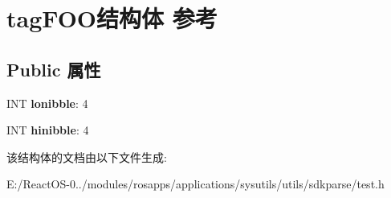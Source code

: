 \hypertarget{structtag_f_o_o}{}\section{tag\+F\+O\+O结构体 参考}
\label{structtag_f_o_o}
\subsection*{Public 属性}
\begin{DoxyCompactItemize}
\item 
\mbox{\label{structtag_f_o_o_ab6ff05a854f1048ebb98945947410295}} 
I\+NT {\bfseries lonibble}\+: 4
\item 
\mbox{\label{structtag_f_o_o_a20c482478d98933ea290a9342397bd1e}} 
I\+NT {\bfseries hinibble}\+: 4
\end{DoxyCompactItemize}


该结构体的文档由以下文件生成\+:\begin{DoxyCompactItemize}
\item 
E\+:/\+React\+O\+S-\/0../modules/rosapps/applications/sysutils/utils/sdkparse/test.\+h\end{DoxyCompactItemize}

